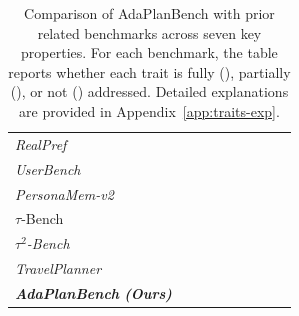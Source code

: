 \documentclass{llmxive}
\providecommand{\cmark}{\ding{51}}
\providecommand{\xmark}{\ding{55}}
\providecommand{\gmark}{\ding{51}}
\providecommand{\BENCH}[1]{\textbf{AdaPlanBench}}
\providecommand{\bench}[1]{AdaPlanBench}
\begin{document}
\begin{table}[!t]
{\begin{tabular}{lcccccccc}
    \textit{RealPref}~\citep{RealPref} & \xmark & \xmark & \xmark & \xmark & \cmark & \cmark & \xmark
    \\ %
    \textit{UserBench}~\citep{UserBench} & \xmark & \cmark & \cmark & \xmark & \cmark & \cmark & \cmark
    \\ %
    \textit{PersonaMem-v2}~\citep{PersonaMem-v2} & \xmark & \cmark & \xmark & \xmark & \cmark & \cmark & \cmark
    \\ %
    $\tau$-Bench~\citep{tau-bench} & \xmark & \cmark & \cmark & \gmark & \gmark & \gmark & \xmark
    \\ 
    \textit{$\tau^2$-Bench}~\citep{tau-2-bench} & \xmark & \cmark & \cmark & \xmark & \cmark & \xmark & \cmark
    \\ %
    \textit{TravelPlanner}~\citep{TravelPlanner} & \xmark & \xmark & \cmark & \cmark & \xmark & \cmark & \cmark
    \\ %
    \midrule
    \textit{\BENCH{} \textbf{(Ours)}} & \cmark & \cmark & \cmark & \cmark & \cmark & \cmark & \cmark
    \\
    \bottomrule
    \end{tabular}
}
\vspace{-1.5mm}
\caption{Comparison of \bench{} with prior related benchmarks across seven key properties. For each benchmark, the table reports whether each trait is fully (\cmark), partially (\gmark), or not (\xmark) addressed. 
Detailed explanations are provided in Appendix~\ref{app:traits-exp}.}
\label{tab:comparison-table}
\vspace{-0.2in}
\end{table}
\end{document}
